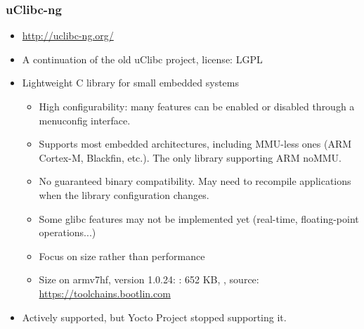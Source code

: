 \begin{frame}
  \frametitle{uClibc-ng}
  \begin{itemize}
  \item \url{http://uclibc-ng.org/}
  \item A continuation of the old uClibc project, license: LGPL
  \item Lightweight C library for small embedded systems
    \begin{itemize}
    \item High configurability: many features can be enabled or
      disabled through a menuconfig interface.
    \item Supports most embedded architectures, including MMU-less
          ones (ARM Cortex-M, Blackfin, etc.). The only library
          supporting ARM noMMU.
    \item No guaranteed binary compatibility. May need to
      recompile applications when the library configuration changes.
    \item Some glibc features may not be implemented yet (real-time,
          floating-point operations...)
    \item Focus on size rather than performance
    \item Size on armv7hf, version 1.0.24:
      : 652 KB, , source: \url{https://toolchains.bootlin.com}
    \end{itemize}
    \item Actively supported, but Yocto Project stopped supporting it.
  \end{itemize}
\end{frame}

